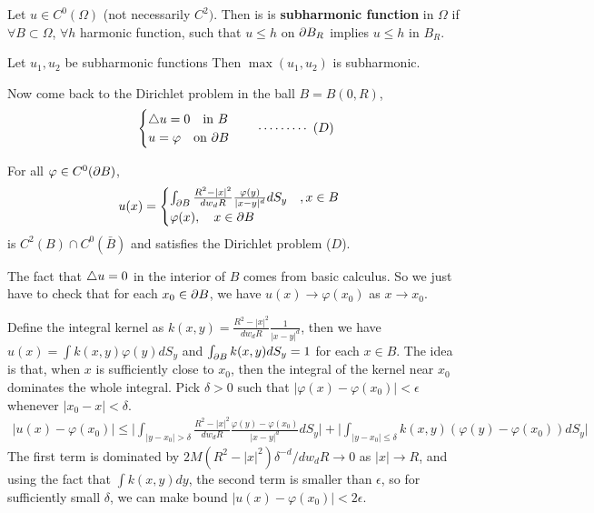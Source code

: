 \documentclass[12pt,a4paper]{article}
\newenvironment{proof}
{\begin{changemargin}{0.5cm}{0.5cm} 
	}%
	{\end{changemargin}
}
\newenvironment{p}
{\begin{proof} 
	}%
	{\end{proof}
}
\begin{document}
 Let $u\in C^0(\Omega)$ (not necessarily $C^2)$. Then is is \textbf{subharmonic function} in $\Omega$ if $\forall B \subset \Omega$, $\forall h$ harmonic function, such that $u\leq h$ on $\partial B_R$ implies $u\leq h$ in $B_R$.
\s 

\lem Let $u_1, u_2$ be subharmonic functions Then $\max(u_1, u_2)$ is subharmonic.
\s

Now come back to the Dirichlet problem in the ball $B = B(0, R)$,
\begin{align*}
\begin{cases}
\triangle u =0 \quad \text{in } B\\
u = \varphi \quad \text{on } \partial B
\end{cases} \quad \cdots\cdots\cdots\,\,(D)
\end{align*}
\s

\thm For all $\varphi \in C^0(\partial B)$,
\begin{align*}
u(x) = \begin{cases}
\int_{\partial B} \frac{R^2 - |x|^2}{dw_d R} \frac{\varphi(y)}{|x-y|^d} dS_y \quad, x\in B\\
\varphi(x), \quad x\in \partial B
\end{cases}
\end{align*}
is $C^2(B) \cap C^0(\bar{B})$ and satisfies the Dirichlet problem ($D$). 
\begin{p}
\pf The fact that $\triangle u =0$ in the interior of $B$ comes from basic calculus. So we just have to check that for each $x_0 \in \partial B$, we have $u(x) \rightarrow \varphi(x_0)$ as $x\rightarrow x_0$.

\quad Define the integral kernel as $k(x,y) = \frac{R^2 - |x|^2}{dw_d R} \frac{1}{|x-y|^d}$, then we have $u(x) = \int k(x,y) \varphi(y) dS_y$ and $\int_{\partial B} k(x,y) dS_y =1$ for each $x\in B$. The idea is that, when $x$ is sufficiently close to $x_0$, then the integral of the kernel near $x_0$ dominates the whole integral. Pick $\delta>0$ such that $|\varphi(x)- \varphi(x_0)|< \epsilon$ whenever $|x_0 -x| < \delta$.
\begin{align*}
|u(x)- \varphi(x_0)| \leq \Big| \int_{|y-x_0|> \delta} \frac{R^2 - |x|^2}{dw_d R} \frac{\varphi(y) - \varphi(x_0)}{|x - y|^d} dS_y \Big| + \Big| \int_{|y-x_0| \leq \delta} k(x,y)(\varphi(y)-\varphi(x_0) )dS_y \Big|
\end{align*}
The first term is dominated by $2M(R^2 - |x|^2)\delta^{-d} / dw_d R \rightarrow 0$ as $|x|\rightarrow R$, and using the fact that $\int k(x,y)dy$, the second term is smaller than $\epsilon$, so for sufficiently small $\delta$, we can make bound $|u(x) - \varphi(x_0)|< 2\epsilon$.

\eop
\end{p}
\s
\end{document}
